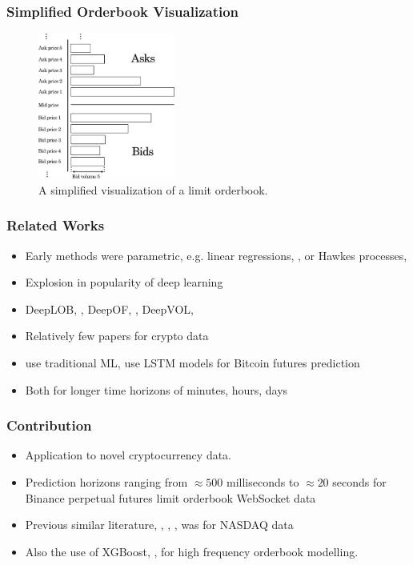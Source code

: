 \documentclass[handout]{beamer}
\begin{document}
\begin{frame}
    \frametitle{Simplified Orderbook Visualization}
    \begin{figure}[htpb]
        \centering
        \includegraphics[width=0.4\textwidth]{./images/orderbook.pdf}
        \caption{A simplified visualization of a limit orderbook.}
    \end{figure}
\end{frame}

\begin{frame}
    \frametitle{Related Works}
     \begin{itemize}
         \item Early methods were parametric, e.g. linear regressions, {\color{blue}\cite{CAO2009}}, or Hawkes processes, {\color{blue}\cite{HAWKES2013}}
        \item Explosion in popularity of deep learning
        \item DeepLOB, {\color{blue}\cite{ZHANG2019}}, DeepOF, {\color{blue}\cite{KOLM2023}}, DeepVOL, {\color{blue}\cite{LUCCHESE2024}}
        \item Relatively few papers for crypto data
        \item {\color{blue}\cite{AKYILDIRIM2023}} use traditional ML, {\color{blue}\cite{SHIN2021}} use LSTM models for Bitcoin futures prediction
        \item Both for longer time horizons of minutes, hours, days
    \end{itemize}
\end{frame}

\begin{frame}
    \frametitle{Contribution}
     \begin{itemize}
    \item Application to novel cryptocurrency data.
    \item Prediction horizons ranging from $\approx 500$ milliseconds to $\approx 20$ seconds for Binance perpetual futures limit orderbook WebSocket data
    \item Previous similar literature, {\color{blue}\cite{ZHANG2019}}, {\color{blue}\cite{KOLM2023}}, {\color{blue}\cite{LUCCHESE2024}}, was for NASDAQ data
    \item Also the use of XGBoost, {\color{blue}\cite{XGBOOST2016}}, for high frequency orderbook modelling. 
    \end{itemize}
    
\end{frame}
\end{document}
